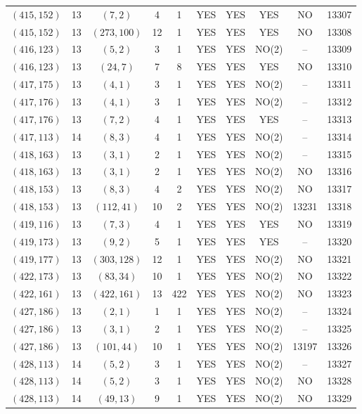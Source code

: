 \begin{longtable}{|c|c|c|c|c|c|c|c|c|c|}
$(415, 152)$ & 13 & $(7, 2)$ & 4 & 1 & YES & YES & YES & NO & 13307\\
$(415, 152)$ & 13 & $(273, 100)$ & 12 & 1 & YES & YES & YES & NO & 13308\\
$(416, 123)$ & 13 & $(5, 2)$ & 3 & 1 & YES & YES & NO(2) & -- & 13309\\
$(416, 123)$ & 13 & $(24, 7)$ & 7 & 8 & YES & YES & YES & NO & 13310\\
$(417, 175)$ & 13 & $(4, 1)$ & 3 & 1 & YES & YES & NO(2) & -- & 13311\\
$(417, 176)$ & 13 & $(4, 1)$ & 3 & 1 & YES & YES & NO(2) & -- & 13312\\
$(417, 176)$ & 13 & $(7, 2)$ & 4 & 1 & YES & YES & YES & -- & 13313\\
$(417, 113)$ & 14 & $(8, 3)$ & 4 & 1 & YES & YES & NO(2) & -- & 13314\\
$(418, 163)$ & 13 & $(3, 1)$ & 2 & 1 & YES & YES & NO(2) & -- & 13315\\
$(418, 163)$ & 13 & $(3, 1)$ & 2 & 1 & YES & YES & NO(2) & NO & 13316\\
$(418, 153)$ & 13 & $(8, 3)$ & 4 & 2 & YES & YES & NO(2) & NO & 13317\\
$(418, 153)$ & 13 & $(112, 41)$ & 10 & 2 & YES & YES & NO(2) & 13231 & 13318\\
$(419, 116)$ & 13 & $(7, 3)$ & 4 & 1 & YES & YES & YES & NO & 13319\\
$(419, 173)$ & 13 & $(9, 2)$ & 5 & 1 & YES & YES & YES & -- & 13320\\
$(419, 177)$ & 13 & $(303, 128)$ & 12 & 1 & YES & YES & NO(2) & NO & 13321\\
$(422, 173)$ & 13 & $(83, 34)$ & 10 & 1 & YES & YES & NO(2) & NO & 13322\\
$(422, 161)$ & 13 & $(422, 161)$ & 13 & 422 & YES & YES & NO(2) & NO & 13323\\
$(427, 186)$ & 13 & $(2, 1)$ & 1 & 1 & YES & YES & NO(2) & -- & 13324\\
$(427, 186)$ & 13 & $(3, 1)$ & 2 & 1 & YES & YES & NO(2) & -- & 13325\\
$(427, 186)$ & 13 & $(101, 44)$ & 10 & 1 & YES & YES & NO(2) & 13197 & 13326\\
$(428, 113)$ & 14 & $(5, 2)$ & 3 & 1 & YES & YES & NO(2) & -- & 13327\\
$(428, 113)$ & 14 & $(5, 2)$ & 3 & 1 & YES & YES & NO(2) & NO & 13328\\
$(428, 113)$ & 14 & $(49, 13)$ & 9 & 1 & YES & YES & NO(2) & NO & 13329\\

\end{longtable}
